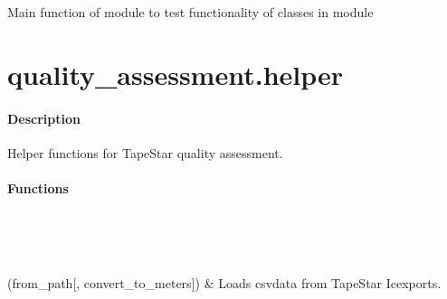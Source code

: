 \documentclass[letterpaper,10pt,english]{sphinxmanual}
\begin{document}
\begin{fulllineitems}
\label{\detokenize{generated/quality_assessment.quality_assessor.main:quality_assessment.quality_assessor.main}}
\sphinxAtStartPar
Main function of module to test functionality of classes in module

\end{fulllineitems}



\chapter{quality\_assessment.helper}
\label{\detokenize{generated/quality_assessment.helper:quality-assessment-helper}}\label{\detokenize{generated/quality_assessment.helper::doc}}\subsubsection*{Description}
\label{\detokenize{generated/quality_assessment.helper:module-quality_assessment.helper}}
\sphinxAtStartPar
Helper functions for TapeStar quality assessment.
\subsubsection*{Functions}


\begin{savenotes}\sphinxatlongtablestart\begin{longtable}[c]{}
\hline

\endfirsthead

%
{}\\
\hline

\endhead

\hline
{}\\
\endfoot

\endlastfoot

\sphinxAtStartPar
{\hyperref[\detokenize{generated/quality_assessment.helper.load_data:quality_assessment.helper.load_data}]{}}(from\_path{[}, convert\_to\_meters{]})
&
\sphinxAtStartPar
Loads csv\sphinxhyphen{}data from TapeStar Ic\sphinxhyphen{}exports.
\\
\hline
\end{longtable}\sphinxatlongtableend\end{savenotes}
\end{document}
